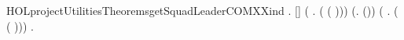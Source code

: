 \newcommand{\HOLprojectUtilitiesTheoremsgetSquadLeaderCOMXXdef}{\UseVerbatim{HOLprojectUtilitiesTheoremsgetSquadLeaderCOMXXdef}}
\begin{SaveVerbatim}{HOLprojectUtilitiesTheoremsgetSquadLeaderCOMXXind}
\HOLTokenTurnstile{} \HOLSymConst{\HOLTokenForall{}}.
      [] \HOLSymConst{\HOLTokenConj{}} (\HOLSymConst{\HOLTokenForall{}} .  ( ( )\HOLSymConst{::})) \HOLSymConst{\HOLTokenConj{}}
     (\HOLSymConst{\HOLTokenForall{}}.   \HOLSymConst{\HOLTokenImp{}}  (\HOLSymConst{::})) \HOLSymConst{\HOLTokenConj{}}
     (\HOLSymConst{\HOLTokenForall{}} .   \HOLSymConst{\HOLTokenImp{}}  ( ( )\HOLSymConst{::})) \HOLSymConst{\HOLTokenImp{}}
     \HOLSymConst{\HOLTokenForall{}}.  
\end{SaveVerbatim}
\newcommand{\HOLprojectUtilitiesTheoremsgetSquadLeaderCOMXXind}{\UseVerbatim{HOLprojectUtilitiesTheoremsgetSquadLeaderCOMXXind}}
